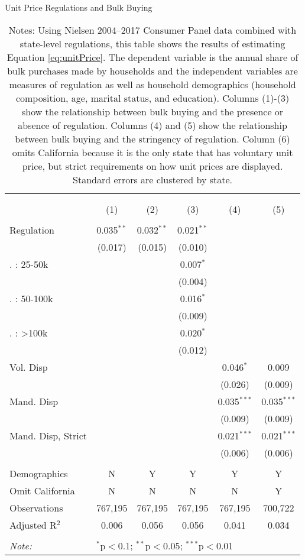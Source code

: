 \begin{table}[!htbp] \centering
  \caption{Unit Price Regulations and Bulk Buying}
  \label{tab:unitPriceLaw}
\begin{tabular}{@{\extracolsep{5pt}}lccccc}
\\[-1.8ex]\hline
\hline \\[-1.8ex]
\\[-1.8ex] & (1) & (2) & (3) & (4) & (5)\\
\hline \\[-1.8ex]
 Regulation & 0.035$^{**}$ & 0.032$^{**}$ & 0.021$^{**}$ &  &  \\
  & (0.017) & (0.015) & (0.010) &  &  \\
   . : 25-50k &  &  & 0.007$^{*}$ &  &  \\
  &  &  & (0.004) &  &  \\
   . : 50-100k &  &  & 0.016$^{*}$ &  &  \\
  &  &  & (0.009) &  &  \\
   . : >100k &  &  & 0.020$^{*}$ &  &  \\
  &  &  & (0.012) &  &  \\
  Vol. Disp &  &  &  & 0.046$^{*}$ & 0.009 \\
  &  &  &  & (0.026) & (0.009) \\
  Mand. Disp &  &  &  & 0.035$^{***}$ & 0.035$^{***}$ \\
  &  &  &  & (0.009) & (0.009) \\
  Mand. Disp, Strict &  &  &  & 0.021$^{***}$ & 0.021$^{***}$ \\
  &  &  &  & (0.006) & (0.006) \\
 \hline \\[-1.8ex]
Demographics & N & Y & Y & Y & Y \\
Omit California & N & N & N & N & Y \\
Observations & 767,195 & 767,195 & 767,195 & 767,195 & 700,722 \\
Adjusted R$^{2}$ & 0.006 & 0.056 & 0.056 & 0.041 & 0.034 \\
\hline
\hline \\[-1.8ex]
\textit{Note:}  & \multicolumn{5}{l}{$^{*}$p$<$0.1; $^{**}$p$<$0.05; $^{***}$p$<$0.01} \\
\end{tabular}
\caption*{Notes: Using Nielsen 2004--2017 Consumer Panel data combined with state-level regulations, this table shows the results of estimating Equation \ref{eq:unitPrice}. The dependent variable is the annual share of bulk purchases made by households and the independent variables are measures of regulation as well as household demographics (household composition, age, marital status, and education). Columns (1)-(3) show the relationship between bulk buying and the presence or absence of regulation. Columns (4) and (5) show the relationship between bulk buying and the stringency of regulation. Column (6) omits California because it is the only state that has voluntary unit price, but strict requirements on how unit prices are displayed. Standard errors are clustered by state.}
\end{table}
